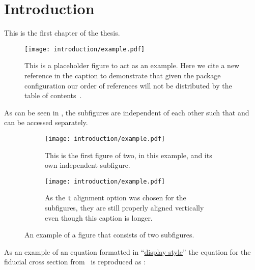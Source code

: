 \chapter{Introduction}\label{chapter:introduction}

This is the first chapter of the \gls{thesis}.~\cite{Aaboud:2016mmw,Bruning:782076}

\begin{figure}[htpb]
 \centering
 \texttt{[image: introduction/example.pdf]}
 \caption[Example placeholder figure with a citation~\cite{Higgs:1964ia} and shorter List of Figures caption.
  The List of Figures is protected from first use of glossary entries or acronyms like \acrlong{LHC}.]{%
  This is a placeholder figure to act as an example.
  Here we cite a new reference in the caption to demonstrate that given the package configuration our order of references will not be distributed by the table of contents~\cite{Higgs:1964ia}.}\label{fig:test_figure}
\end{figure}

As can be seen in , the subfigures are independent of each other such that  and  can be accessed separately.

\begin{figure}[htbp]
 \centering
 \begin{subfigure}[t]{0.48\textwidth}
  \centering
  \texttt{[image: introduction/example.pdf]}
  \caption[Short List of Figures captions work with subfigures too.]{%
   This is the first figure of two, in this example, and its own independent subfigure.}
  \label{fig:subfigure_1}
 \end{subfigure}%
 \quad
 \begin{subfigure}[t]{0.48\textwidth}
  \centering
  \texttt{[image: introduction/example.pdf]}
  \caption[Which makes the List of Figures readable and actually helpful.]{%
   As the \texttt{t} alignment option was chosen for the subfigures, they are still properly aligned vertically even though this caption is longer.}
  \label{fig:subfigure_2}
 \end{subfigure}
 \caption{An example of a figure that consists of two subfigures.}
 \label{fig:subfigure_example}
\end{figure}

As an example of an equation formatted in ``\href{https://www.overleaf.com/learn/latex/Display_style_in_math_mode}{display style}'' the equation for the fiducial cross section from~\cite{Aaboud:2016mmw} is reproduced as :

